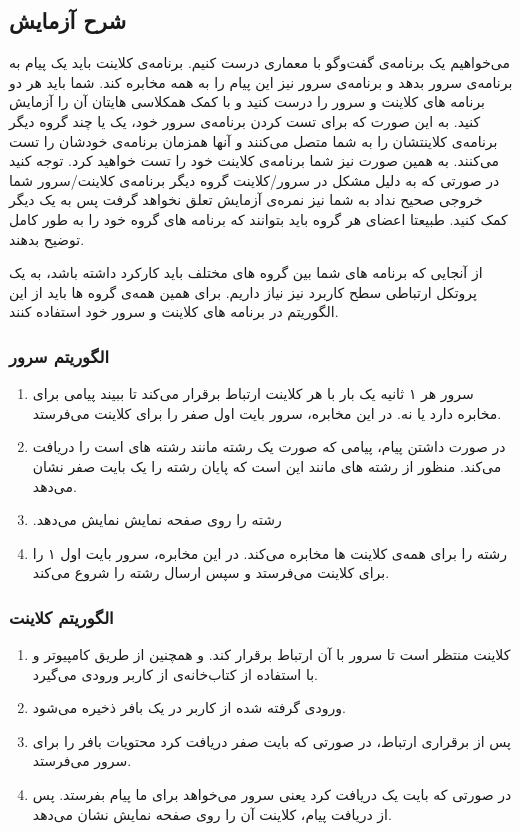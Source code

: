 \subsection{شرح آزمایش}

می‌خواهیم یک برنامه‌ی گفت‌وگو با معماری  درست کنیم. برنامه‌ی کلاینت باید یک پیام به برنامه‌ی سرور بدهد و برنامه‌ی سرور نیز این پیام را به همه مخابره کند. شما باید هر دو برنامه های کلاینت و سرور را درست کنید و با کمک همکلاسی هایتان آن را آزمایش کنید. به این صورت که برای تست کردن برنامه‌ی سرور خود، یک یا چند گروه دیگر برنامه‌ی کلاینتشان را به شما متصل می‌کنند و آنها همزمان برنامه‌ی خودشان را تست می‌کنند. به همین صورت نیز شما برنامه‌ی کلاینت خود را تست خواهید کرد. توجه کنید در صورتی که به دلیل مشکل در سرور/کلاینت گروه دیگر برنامه‌ی کلاینت/سرور شما خروجی صحیح نداد به شما نیز نمره‌ی آزمایش تعلق نخواهد گرفت پس به یک دیگر کمک کنید. طبیعتا اعضای هر گروه باید بتوانند که برنامه های گروه خود را به طور کامل توضیح بدهند.
\newline

از آنجایی که برنامه های شما بین گروه های مختلف باید کارکرد داشته باشد، به یک پروتکل ارتباطی سطح کاربرد نیز نیاز داریم. برای همین همه‌ی گروه ها باید از این الگوریتم در برنامه‌ های کلاینت و سرور خود استفاده کنند.

\subsubsection{الگوریتم سرور}
\begin{enumerate}
    \item سرور هر ۱ ثانیه یک بار با هر کلاینت ارتباط برقرار می‌کند تا ببیند پیامی برای مخابره دارد یا نه. در این مخابره، سرور بایت اول صفر را برای کلاینت می‌فرستد.
    \item در صورت داشتن پیام، پیامی که صورت یک رشته مانند رشته های  است را دریافت می‌کند. منظور از رشته های مانند  این است که پایان رشته را یک بایت صفر نشان می‌دهد.
    \item .رشته را روی صفحه نمایش نمایش می‌دهد
    \item رشته را برای همه‌ی کلاینت ها مخابره می‌کند. در این مخابره، سرور بایت اول ۱ را برای کلاینت می‌فرستد و سپس ارسال رشته را شروع می‌کند.
\end{enumerate}


\subsubsection{الگوریتم کلاینت}
\begin{enumerate}
    \item کلاینت منتظر است تا سرور با آن ارتباط برقرار کند. و همچنین از طریق کامپیوتر و با استفاده از کتاب‌خانه‌ی  از کاربر ورودی می‌گیرد.
    \item ورودی گرفته شده از کاربر در یک بافر ذخیره می‌شود.
    \item پس از برقراری ارتباط، در صورتی که بایت صفر دریافت کرد محتویات بافر را برای سرور می‌فرستد.
    \item در صورتی که بایت یک دریافت کرد یعنی سرور می‌خواهد برای ما پیام بفرستد. پس از دریافت پیام، کلاینت آن را روی صفحه نمایش نشان می‌دهد.
\end{enumerate}

